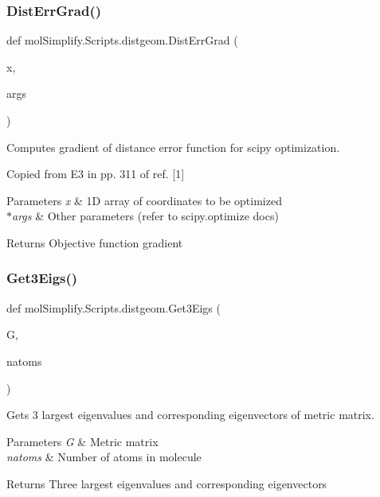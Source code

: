 \subsubsection{\texorpdfstring{Dist\+Err\+Grad()}{DistErrGrad()}}
{\footnotesize\ttfamily def mol\+Simplify.\+Scripts.\+distgeom.\+Dist\+Err\+Grad (\begin{DoxyParamCaption}\item[{}]{x,  }\item[{}]{args }\end{DoxyParamCaption})}



Computes gradient of distance error function for scipy optimization. 

Copied from E3 in pp. 311 of ref. \mbox{[}1\mbox{]} 
\begin{DoxyParams}{Parameters}
{\em x} & 1D array of coordinates to be optimized \\
\hline
{\em $\ast$args} & Other parameters (refer to scipy.\+optimize docs) \\
\hline
\end{DoxyParams}
\begin{DoxyReturn}{Returns}
Objective function gradient 
\end{DoxyReturn}
\mbox{\label{namespacemolSimplify_1_1Scripts_1_1distgeom_ae35bf82aac3a079973c82389260e6437}} 
\subsubsection{\texorpdfstring{Get3\+Eigs()}{Get3Eigs()}}
{\footnotesize\ttfamily def mol\+Simplify.\+Scripts.\+distgeom.\+Get3\+Eigs (\begin{DoxyParamCaption}\item[{}]{G,  }\item[{}]{natoms }\end{DoxyParamCaption})}



Gets 3 largest eigenvalues and corresponding eigenvectors of metric matrix. 


\begin{DoxyParams}{Parameters}
{\em G} & Metric matrix \\
\hline
{\em natoms} & Number of atoms in molecule \\
\hline
\end{DoxyParams}
\begin{DoxyReturn}{Returns}
Three largest eigenvalues and corresponding eigenvectors 
\end{DoxyReturn}
\mbox{\label{namespacemolSimplify_1_1Scripts_1_1distgeom_a511e618a1e62d7d1ad97e26692c62a42}} 
